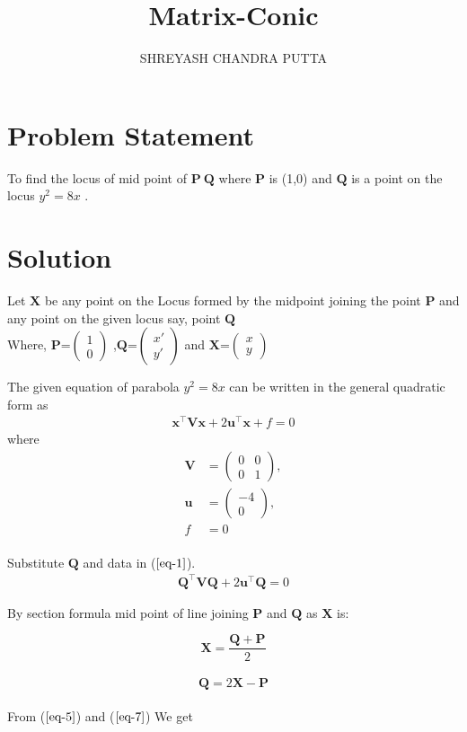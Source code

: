 \documentclass[journal,10pt,twocolumn]{article}
\title{
Matrix-Conic
}
\author{SHREYASH CHANDRA PUTTA}
\newcommand{\myvec}[1]{\ensuremath{\begin{pmatrix}#1\end{pmatrix}}}
\let\vec\mathbf
\let\vec\mathbf
\begin{document}
\maketitle
\tableofcontents
\bigskip
\section{Problem Statement}
To find the locus of mid point of $\vec{P\:Q}$ where $\vec{P}$ is (1,0) and $\vec{Q}$ is a point on the locus $y^{2} = 8x$ .

\section{Solution}
Let $\vec{X}$ be any point on the Locus formed by the midpoint joining the point $\vec{P}$ and any point on the given locus say, point $\vec{Q}$  \\

Where, 
  ${\vec{P}}$=$\myvec{
  1\\
  0}$
  ,${\vec{Q}}$=$\myvec{
  x'\\
  y'}$
 and ${\vec{X}}$=$\myvec{
  x\\
  y}$


The given equation of parabola $y^2 = 8x$ can be written in the general quadratic form as
\begin{align}
    \vec{x}^{\top}\vec{V}\vec{x}+2\vec{u}^{\top}\vec{x}+f=0
    \label{eq-1}
    \end{align}
where
\begin{align}
	\label{eq:V_matrix}
	\vec{V} &= \myvec{0 & 0\\0 & 1},
	\\
	\label{eq:u_vector}
	\vec{u} &= \myvec{-4\\0},
	\\
	\label{eq:f_value}
	f &= 0
\end{align}
\\
Substitute $\vec{Q}$ and data in ($\ref{eq-1}$).
\\
\begin{align}
    \vec{Q}^{\top}\vec{V}\vec{Q}+2\vec{u}^{\top}\vec{Q}=0
    \label{eq-5}
    \end{align}

By section formula
mid point of line joining $\vec{P}$ and $\vec{Q}$ as $\vec{X}$ is:
 
 \begin{equation}
	\vec{X}=\frac{\vec{Q}+\vec{P}}{2}
	 \label{eq-6}
\end{equation}
\\
 \begin{equation}
	\vec{Q}=2\vec{X}-\vec{P}
	 \label{eq-7}
\end{equation}
\\
From ($\ref{eq-5}$) and ($\ref{eq-7}$) We get 
\end{document}
